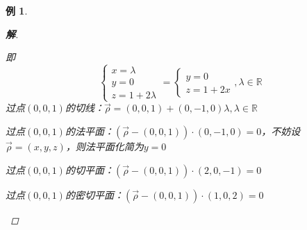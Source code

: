 \documentclass{article}                     %
\numberwithin{equation}{section}            %
\numberwithin{figure}{section}              %
\numberwithin{table}{section}               %
\newtheorem{example}{\indent 例}[section]
\newenvironment{solution}{\begin{proof}[\indent\bf 解]}{\end{proof}}
\begin{document}
\begin{example}
\begin{solution}
\begin{enumerate}
            即
            \begin{equation*}
                \left\{\begin{matrix}
                    x=\lambda \\
                    y=0\\
                    z=1+2\lambda
                   \end{matrix}\right.
                =
                \left\{\begin{matrix}
                    y=0\\
                    z=1+2x
                   \end{matrix}\right.
                   ,\lambda \in \mathbb{R} 
            \end{equation*}
            过点$(0,0,1)$的切线：$\vec{\rho }=(0,0,1)+(0,-1,0)\lambda ,\lambda \in \mathbb{R}$

            过点$(0,0,1)$的法平面：$(\vec{\rho }-(0,0,1))\cdot (0,-1,0)=0 $，不妨设$\vec{\rho}=(x,y,z)$，则法平面化简为$y=0$

            过点$(0,0,1)$的切平面：$(\vec{\rho }-(0,0,1))\cdot (2,0,-1)=0 $

            过点$(0,0,1)$的密切平面：$(\vec{\rho }-(0,0,1))\cdot (1,0,2)=0 $
        \end{enumerate}
    \end{solution}
\end{example}
\end{document}
